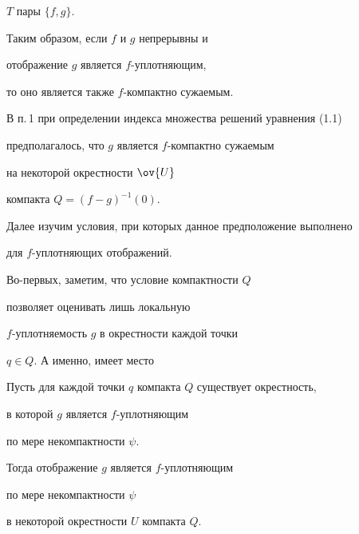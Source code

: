 $T$ пары $\{f,g \}$.


Таким образом, если $f$ и $g$ непрерывны и


отображение $g$ является $f$-уплотняющим,


то оно является также $f$-компактно сужаемым.





В п.\,1 при определении индекса множества решений уравнения (1.1)


предполагалось, что $g$ является $f$-компактно сужаемым


на некоторой окрестности $\ov {U}$


компакта $Q = (f-g)^{-1}(0)$.


Далее изучим условия, при которых данное предположение выполнено 


для $f$-уплотняющих отображений.


Во-первых, заметим, что условие компактности $Q$ 


позволяет оценивать лишь локальную 


$f$-уплотняемость $g$ в окрестности каждой точки


$q \in Q$. А именно, имеет место





\begin{lems}


Пусть для каждой точки $q$ компакта $Q$ существует окрестность,


в которой $g$ является $f$-уплотняющим 


по мере некомпактности $\psi$.


Тогда отображение $g$ является $f$-уплотняющим


по мере некомпактности $\psi$


в некоторой окрестности $U$ компакта $Q$.


\end{lems}





